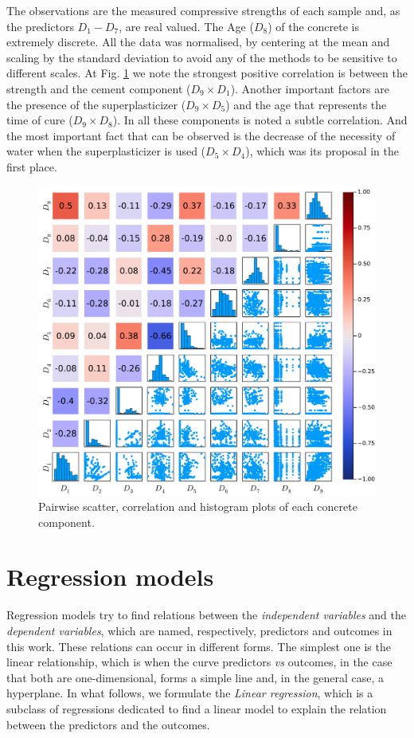 \documentclass[conference]{IEEEtran}
\begin{document}
The observations are the measured compressive strengths of each sample and, as the predictors $D_1 - D_7$, are real valued. The Age ($D_8$) of the concrete is extremely discrete. All the data was normalised, by centering at the mean and scaling by the standard deviation to avoid any of the methods to be sensitive to different scales. At Fig. \ref{histogram_biplot} we note the strongest positive correlation is between the strength and the cement component ($D_9 \times D_1$). Another important factors are the presence of the superplasticizer ($D_9 \times D_5$) and the age that represents the time of cure ($D_9 \times D_8$). In all these components is noted a subtle correlation. And the most important fact that can be observed is the decrease of the necessity of water when the superplasticizer is used ($D_5 \times D_4$), which was its proposal in the first place.
\begin{figure}[htbp]
\centerline{\includegraphics[width=\columnwidth]{../figures/correlation_predictors_outcomes}}
\caption{Pairwise scatter, correlation and histogram plots of each concrete component.}
\label{histogram_biplot}
\end{figure}

\section{Regression models}\label{sec:rm}

Regression models try to find relations between the \emph{independent variables} and the \emph{dependent variables}, which are named, respectively, predictors and outcomes in this work. These relations can occur in different forms. The simplest one is the linear relationship, which is when the curve predictors \textit{vs} outcomes, in the case that both are one-dimensional, forms a simple line and, in the general case, a hyperplane. {\color{red}In what follows, we formulate the \emph{Linear regression}, which is a subclass of regressions dedicated to find a linear model to explain the relation between the predictors and the outcomes. }
\end{document}

